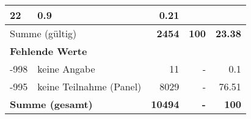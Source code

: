 \begin{longtable}{lXrrr}
       \num{22} &
       \num[round-mode=places,round-precision=2]{0.9} &
         \num[round-mode=places,round-precision=2]{0.21} \\
     \midrule
     \multicolumn{2}{l}{Summe (gültig)} &
       \textbf{\num{2454}} &
     \textbf{\num{100}} &
       \textbf{\num[round-mode=places,round-precision=2]{23.38}} \\
     \multicolumn{5}{l}{\textbf{Fehlende Werte}}\\
       -998 &
       keine Angabe &
         \num{11} &
        - &
         \num[round-mode=places,round-precision=2]{0.1} \\
       -995 &
       keine Teilnahme (Panel) &
         \num{8029} &
        - &
         \num[round-mode=places,round-precision=2]{76.51} \\
     \midrule
     \multicolumn{2}{l}{\textbf{Summe (gesamt)}} &
          \textbf{\num{10494}} &
        \textbf{-} &
        \textbf{\num{100}} \\
     \bottomrule
     \end{longtable}
     
